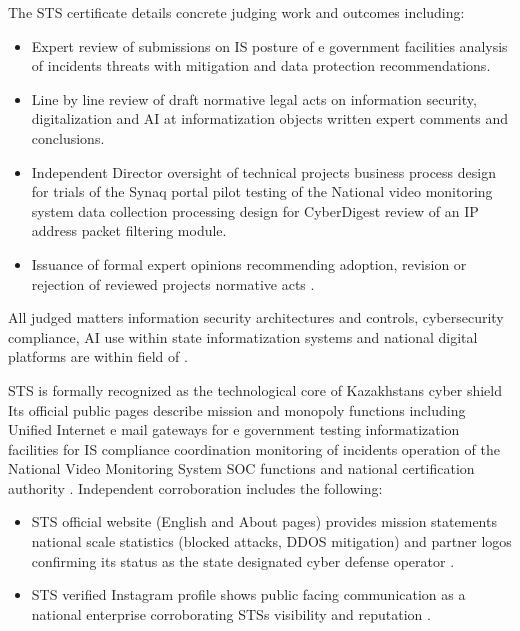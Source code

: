 The STS certificate details concrete judging work and outcomes including:
\vspace{-0.5\baselineskip}
\begin{itemize}[nosep]
\item Expert review of submissions on IS posture of e government facilities analysis of incidents threats with mitigation and data protection recommendations.
\item Line by line review of draft normative legal acts on information security, digitalization and AI at informatization objects written expert comments and conclusions.
\item Independent Director oversight of technical projects business process design for trials of the Synaq portal pilot testing of the National video monitoring system data collection processing design for CyberDigest review of an IP address packet filtering module.
\item Issuance of formal expert opinions recommending adoption, revision or rejection of reviewed projects normative acts .
\end{itemize}

All judged matters information security architectures and controls, cybersecurity compliance, AI use within state informatization systems and national digital platforms are within \mrls field of \fie.

STS is formally recognized as the technological core of Kazakhstans cyber shield Its official public pages describe mission and monopoly functions including Unified Internet e mail gateways for e government testing informatization facilities for IS compliance coordination monitoring of incidents operation of the National Video Monitoring System SOC functions and national certification authority . Independent corroboration includes the following:
\vspace{-0.5\baselineskip}
\begin{itemize}[nosep]
\item STS official website (English and About pages) provides mission statements national scale statistics (blocked attacks, DDOS mitigation) and partner logos confirming its status as the state designated cyber defense operator .
\item STS verified Instagram profile shows public facing communication as a national enterprise corroborating STSs visibility and reputation .
\end{itemize}



